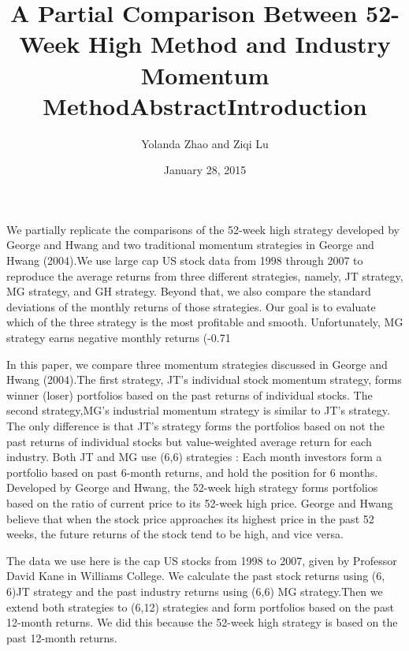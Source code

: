 \documentclass{article}
\title{A Partial Comparison Between 52-Week High Method and Industry Momentum Method}
\author{Yolanda Zhao and Ziqi Lu}
\date{January 28, 2015}
\begin{document}

\maketitle
\pagebreak


\title{\Large Abstract}


We partially replicate the comparisons of the 52-week high strategy developed by George and Hwang and two traditional momentum strategies in George and Hwang (2004).We use large cap US stock data from 1998 through 2007 to reproduce the average returns from three different strategies, namely, JT strategy, MG strategy, and GH strategy. Beyond that, we also compare the standard deviations of the monthly returns of those strategies. Our goal is to evaluate which of the three strategy is the most profitable and smooth. Unfortunately, MG strategy earns negative monthly returns (-0.71%

\pagebreak

\title{\Large Introduction}


In this paper, we compare three momentum strategies discussed in George and Hwang (2004).The first strategy, JT’s individual stock momentum strategy, forms winner (loser) portfolios based on the past returns of individual stocks. The second strategy,MG’s industrial momentum strategy is similar to JT’s strategy. The only difference is that JT’s strategy forms the portfolios based on not the past returns of individual stocks but value-weighted average return for each industry.  Both JT and MG use (6,6) strategies : Each month investors form a portfolio based on past 6-month returns, and hold the position for 6 months. Developed by George and Hwang, the 52-week high strategy forms portfolios based on the ratio of current price to its 52-week high price. George and Hwang believe that when the stock price approaches its highest price in the past 52 weeks, the future returns of the stock tend to be high, and vice versa.

The data we use here is the cap US stocks from 1998 to 2007, given by Professor David Kane in Williams College. We calculate the past stock returns using (6, 6)JT strategy and the past industry returns using (6,6) MG strategy.Then we extend both strategies to (6,12) strategies and form portfolios based on the past 12-month returns. We did this because the 52-week high strategy is based on the past 12-month returns.
\end{document}
